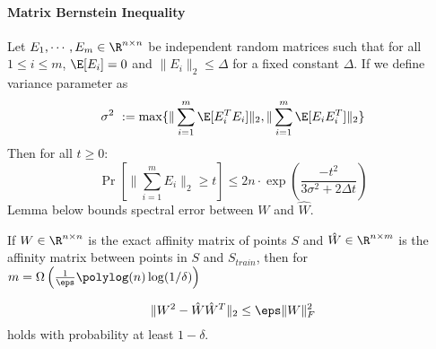 \documentclass{sig-alternate}
\begin{document}
\paragraph{Matrix Bernstein Inequality}
Let $E_1,\cdots,E_m \in \R^{n\times n}$ be independent random matrices such that for all $1 \leq i \leq m$, $\E[E_i] = 0$ and $\|E_i\|_2 \leq \Delta$ for a fixed constant $\Delta$. If we define variance parameter as \[
\sigma^2 ~:= \max \{\|\sum_{i=1}^m \E[E_i^T E_i]\|_2,\|\sum_{i=1}^m \E[E_i E_i^T]\|_2 \}
\]
Then for all $t \geq 0$:
\[
\Pr\left[\Big\|\sum_{i=1}^m E_i\Big\|_2 \geq t \right] \leq 2n \cdot \exp\left(\frac{-t^2}{3\sigma^2 + 2\Delta t}\right)
\]
Lemma below bounds spectral error between $W$ and $\hat W$.
\begin{lemma}
\label{lem:cs_bernstein}
If $W \in \R^{n \times n}$ is the exact affinity matrix of points $S$ and $\hat{W} \in \R^{n \times m}$ is the affinity matrix between points in $S$ and $S_{train}$, then for $m = \Omega \left(  \frac{1}{\eps} \polylog(n) \log(1/\delta) \right) $

\[
\|W^2-\hat{W}\hat{W}^T\|_2 \leq \eps \|W\|_F^2
\]
holds with probability at least $1-\delta$.
\end{lemma}
\end{document}
